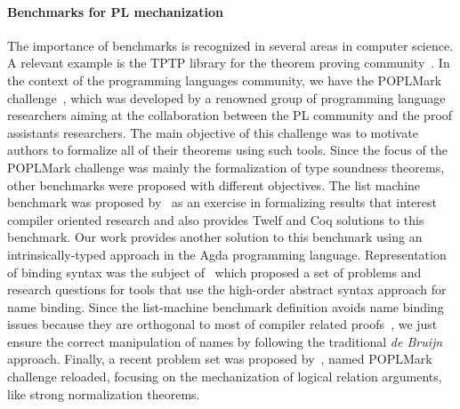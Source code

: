 \documentclass[review]{elsarticle}
\theoremstyle{definition}
\begin{document}
\paragraph{Benchmarks for PL mechanization}{
The importance of benchmarks is recognized in several areas in computer science. A relevant example is the
TPTP library for the theorem proving community~\cite{Sut17}. In the context of the programming languages community,
we have the POPLMark challenge~\cite{Aydemir05}, which was developed by a renowned group of programming language researchers aiming
at the collaboration between the PL community and the proof assistants researchers. The main objective of this challenge
was to motivate authors to formalize all of their theorems using such tools. Since the focus of the POPLMark challenge
was mainly the formalization of type soundness theorems, other benchmarks were proposed with different objectives. The list
machine benchmark was proposed by~\cite{Appel07} as an exercise in formalizing results that interest
compiler oriented research and also provides Twelf and Coq solutions to this benchmark. Our work provides another
solution to this benchmark using an intrinsically-typed approach in the Agda programming language. Representation of binding syntax
was the subject of~\cite{FeltyMP18} which proposed a set of problems and research questions for tools
that use the high-order abstract syntax approach for name binding. Since the list-machine benchmark definition avoids
name binding issues because they are orthogonal to most of compiler related proofs~\cite{Appel07}, we just ensure
the correct manipulation of names by following the traditional \emph{de Bruijn} approach. Finally, a recent problem set
was proposed by~\cite{Pientka18}, named POPLMark challenge reloaded, focusing on the mechanization
of logical relation arguments, like strong normalization theorems.}
\end{document}
